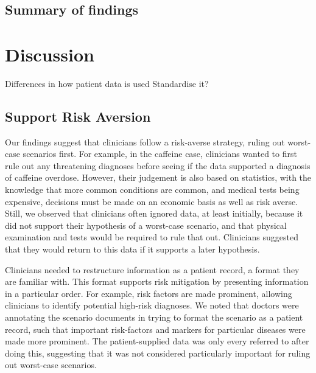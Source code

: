 \documentclass{sigchi}
\begin{document}
\subsection{Summary of findings}

\section{Discussion}





Differences in how patient data is used
Standardise it?

\subsection{Support Risk Aversion} %


Our findings suggest that clinicians follow a risk-averse strategy, ruling out worst-case scenarios first. For example, in the caffeine case, clinicians wanted to first rule out any threatening diagnoses before seeing if the data supported a diagnosis of caffeine overdose. However, their judgement is also based on statistics, with the knowledge that more common conditions are common, and medical tests being expensive, decisions must be made on an economic basis as well as risk averse. Still, we observed that clinicians often ignored data, at least initially, because it did not support their hypothesis of a worst-case scenario, and that physical examination and tests would be required to rule that out. Clinicians suggested that they would return to this data if it supports a later hypothesis.

Clinicians needed to restructure information as a patient record, a format they are familiar with. This format supports risk mitigation by presenting information in a particular order. For example, risk factors are made prominent, allowing clinicians to identify potential high-risk diagnoses. We noted that doctors were annotating the scenario documents in trying to format the scenario as a patient record, such that important risk-factors and markers for particular diseases were made more prominent. The patient-supplied data was only every referred to after doing this, suggesting that it was not considered particularly important for ruling out worst-case scenarios.
\end{document}

